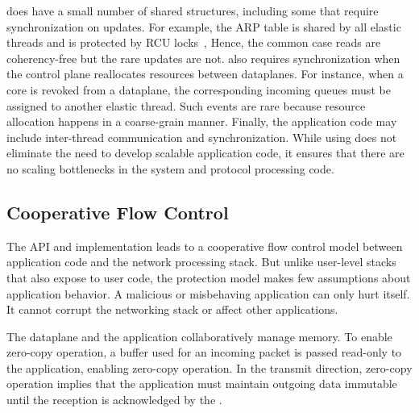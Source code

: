 



\ix does have a small number of shared structures, including some that
require synchronization on updates.  For example, the ARP table is
shared by all elastic threads and is protected by RCU
locks~\cite{mckenney1998read}, Hence, the common case reads are
coherency-free but the rare updates are not. \ix also requires
synchronization when the control plane reallocates resources between
dataplanes.  For instance, when a core is revoked from a dataplane,
the corresponding incoming queues must be assigned to another elastic
thread. Such events are rare because resource allocation happens in a
coarse-grain manner. Finally, the application code may include
inter-thread communication and synchronization. While using \ix does
not eliminate the need to develop scalable application code, it
ensures that there are no scaling bottlenecks in the system and
protocol processing code. 

\subsection{Cooperative Flow Control}
\label{sec:impl:coop}

The \ix API and implementation leads to a cooperative flow control
model between application code and the network processing stack.  But
unlike user-level stacks that also expose  to user code,
the \ix protection model makes few assumptions about application
behavior. A malicious or misbehaving application can only hurt
itself. It cannot corrupt the networking stack or affect other
applications.

The \ix dataplane and the application collaboratively manage
memory. To enable zero-copy operation, a buffer used for an incoming
packet is passed read-only to the application, enabling zero-copy
operation. 
In the transmit direction, zero-copy
operation implies that the application must maintain outgoing data
immutable until the reception is acknowledged by the . 

